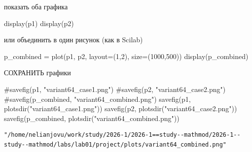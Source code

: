 \documentclass[
  12pt,
  a4paper,
  DIV=11,
  numbers=noendperiod]{scrreprt}
\newenvironment{Shaded}{\begin{snugshade}}{\end{snugshade}}
\newcommand{\CommentTok}[1]{\textcolor[rgb]{0.37,0.37,0.37}{#1}}
\newcommand{\FloatTok}[1]{\textcolor[rgb]{0.68,0.00,0.00}{#1}}
\newcommand{\FunctionTok}[1]{\textcolor[rgb]{0.28,0.35,0.67}{#1}}
\newcommand{\NormalTok}[1]{\textcolor[rgb]{0.00,0.23,0.31}{#1}}
\newcommand{\OperatorTok}[1]{\textcolor[rgb]{0.37,0.37,0.37}{#1}}
\newcommand{\StringTok}[1]{\textcolor[rgb]{0.13,0.47,0.30}{#1}}
\begin{document}
показать оба графика

\begin{Shaded}
\begin{Highlighting}[]
\FunctionTok{display}\NormalTok{(p1)}
\FunctionTok{display}\NormalTok{(p2)}
\end{Highlighting}
\end{Shaded}





или объединить в один рисунок (как в Scilab)

\begin{Shaded}
\begin{Highlighting}[]
\NormalTok{p\_combined }\OperatorTok{=} \FunctionTok{plot}\NormalTok{(p1, p2, layout}\OperatorTok{=}\NormalTok{(}\FloatTok{1}\NormalTok{,}\FloatTok{2}\NormalTok{), size}\OperatorTok{=}\NormalTok{(}\FloatTok{1000}\NormalTok{,}\FloatTok{500}\NormalTok{))}
\FunctionTok{display}\NormalTok{(p\_combined)}
\end{Highlighting}
\end{Shaded}



СОХРАНИТЬ графики

\begin{Shaded}
\begin{Highlighting}[]
\CommentTok{\#savefig(p1, "variant64\_case1.png")}
\CommentTok{\#savefig(p2, "variant64\_case2.png")}
\CommentTok{\#savefig(p\_combined, "variant64\_combined.png")}
\FunctionTok{savefig}\NormalTok{(p1, }\FunctionTok{plotsdir}\NormalTok{(}\StringTok{"variant64\_case1.png"}\NormalTok{))}
\FunctionTok{savefig}\NormalTok{(p2, }\FunctionTok{plotsdir}\NormalTok{(}\StringTok{"variant64\_case2.png"}\NormalTok{))}
\FunctionTok{savefig}\NormalTok{(p\_combined, }\FunctionTok{plotsdir}\NormalTok{(}\StringTok{"variant64\_combined.png"}\NormalTok{))}
\end{Highlighting}
\end{Shaded}

\begin{verbatim}
"/home/nelianjovu/work/study/2026-1/2026-1==study--mathmod/2026-1--study--mathmod/labs/lab01/project/plots/variant64_combined.png"
\end{verbatim}
\end{document}
